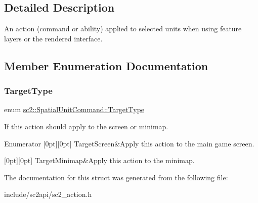 \subsection{Detailed Description}
An action (command or ability) applied to selected units when using feature layers or the rendered interface. 

\subsection{Member Enumeration Documentation}
\mbox{\label{structsc2_1_1_spatial_unit_command_ad50a0bbdbaff9ef68fbda3d817d3a32e}} 
\subsubsection{\texorpdfstring{Target\+Type}{TargetType}}
{\footnotesize\ttfamily enum \hyperlink{structsc2_1_1_spatial_unit_command_ad50a0bbdbaff9ef68fbda3d817d3a32e}{sc2\+::\+Spatial\+Unit\+Command\+::\+Target\+Type}}



If this action should apply to the screen or minimap. 

\begin{DoxyEnumFields}{Enumerator}
[0pt][0pt]{}\mbox{\label{structsc2_1_1_spatial_unit_command_ad50a0bbdbaff9ef68fbda3d817d3a32ea7f95fd3b8b1bbeb6221f223074dbbf9a}} 
Target\+Screen&Apply this action to the main game screen. \\
\hline

[0pt][0pt]{}\mbox{\label{structsc2_1_1_spatial_unit_command_ad50a0bbdbaff9ef68fbda3d817d3a32ea5c3cb6c9cf1642ef2579036167621b36}} 
Target\+Minimap&Apply this action to the minimap. \\
\hline

\end{DoxyEnumFields}


The documentation for this struct was generated from the following file\+:\begin{DoxyCompactItemize}
\item 
include/sc2api/sc2\+\_\+action.\+h\end{DoxyCompactItemize}
